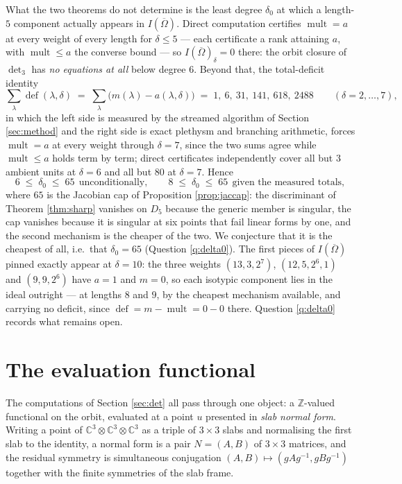 \documentclass[11pt,reqno]{amsart}
\theoremstyle{plain}
\theoremstyle{definition}
\DeclareMathOperator{\mult}{mult}
\DeclareMathOperator{\dfc}{def}
\newcommand{\cO}{\overline{\Omega}}
\newcommand{\bC}{\mathbb{C}}
\newcommand{\bZ}{\mathbb{Z}}
\begin{document}
What the two theorems do not determine is the least degree $\delta_0$ at which
a length-$5$ component actually appears in $I(\cO)$.  Direct computation
certifies $\mult=a$ at every weight of every length for $\delta\le5$ --- each
certificate a rank attaining $a$, with $\mult\le a$ the converse bound --- so
$I(\cO)_\delta=0$ there: the orbit closure of $\det_3$ has \emph{no equations
at all} below degree $6$.  Beyond that, the total-deficit identity
\[
  \sum_\lambda\dfc(\lambda,\delta)
  \;=\;\sum_\lambda\big(m(\lambda)-a(\lambda,\delta)\big)
  \;=\;1,\ 6,\ 31,\ 141,\ 618,\ 2488
  \qquad(\delta=2,\dots,7),
\]
in which the left side is measured by the streamed algorithm of Section
\ref{sec:method} and the right side is exact plethysm and branching
arithmetic, forces $\mult=a$ at every weight through $\delta=7$, since the two
sums agree while $\mult\le a$ holds term by term; direct certificates
independently cover all but $3$ ambient units at $\delta=6$ and all but $80$
at $\delta=7$.  Hence
\[
  6\;\le\;\delta_0\;\le\;65\ \ \text{unconditionally},
  \qquad
  8\;\le\;\delta_0\;\le\;65\ \ \text{given the measured totals},
\]
where $65$ is the Jacobian cap of Proposition \ref{prop:jaccap}: the
discriminant of Theorem \ref{thm:sharp} vanishes on $D_5$ because the generic
member is singular, the cap vanishes because it is singular at six points that
fail linear forms by one, and the second mechanism is the cheaper of the two.
We conjecture that it is the cheapest of all, i.e.\ that $\delta_0=65$
(Question \ref{q:delta0}).  The first pieces of $I(\cO)$ pinned exactly appear at
$\delta=10$: the three weights $(13,3,2^{7})$, $(12,5,2^{6},1)$ and
$(9,9,2^{6})$ have $a=1$ and $m=0$, so each isotypic component lies in the
ideal outright --- at lengths $8$ and $9$, by the cheapest mechanism
available, and carrying no deficit, since $\dfc=m-\mult=0-0$ there.  Question
\ref{q:delta0} records what remains open.

\section{The evaluation functional}\label{sec:functional}

The computations of Section \ref{sec:det} all pass through one object: a
$\bZ$-valued functional on the orbit, evaluated at a point $u$ presented in
\emph{slab normal form}.  Writing a point of $\bC^{3}\otimes\bC^{3}\otimes\bC^{3}$
as a triple of $3\times3$ slabs and normalising the first slab to the identity,
a normal form is a pair $N=(A,B)$ of $3\times3$ matrices, and the residual
symmetry is simultaneous conjugation $(A,B)\mapsto(gAg^{-1},gBg^{-1})$ together
with the finite symmetries of the slab frame.
\end{document}
